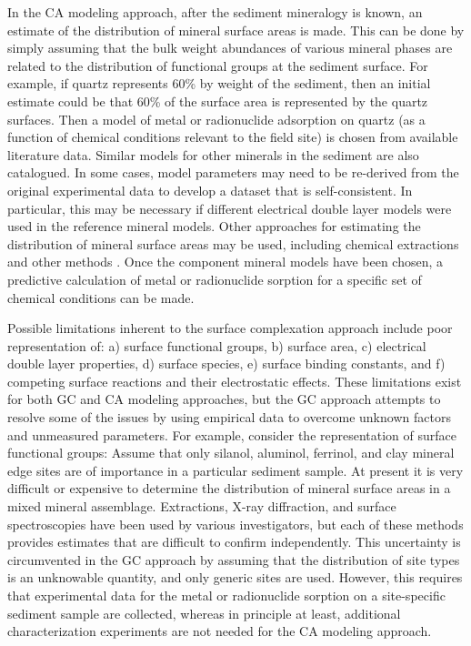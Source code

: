 In the CA modeling approach, after the sediment mineralogy is known, an estimate of the distribution of mineral surface areas is made.  This can be done by simply assuming that the bulk weight abundances of various mineral phases are related to the distribution of functional groups at the sediment surface.  For example, if quartz represents 60\% by weight of the sediment, then an initial estimate could be that 60\% of the surface area is represented by the quartz surfaces. Then a model of metal or radionuclide adsorption on quartz (as a function of chemical conditions relevant to the field site) is chosen from available literature data.  Similar models for other minerals in the sediment are also catalogued.  In some cases, model parameters may need to be re-derived from the original experimental data to develop a dataset that is self-consistent. In particular, this may be necessary if different electrical double layer models were used in the reference mineral models.  Other approaches for estimating the distribution of mineral surface areas may be used, including chemical extractions and other methods \citep{davis-2004, davis-1998}.  Once the component mineral models have been chosen, a predictive calculation of metal or radionuclide sorption for a specific set of chemical conditions can be made.

Possible limitations inherent to the surface complexation approach include poor representation of: a) surface functional groups, b) surface area, c) electrical double layer properties, d) surface species, e) surface binding constants, and f) competing surface reactions and their electrostatic effects. These limitations exist for both GC and CA modeling approaches, but the GC approach attempts to resolve some of the issues by using empirical data to overcome unknown factors and unmeasured parameters. For example, consider the representation of surface functional groups: Assume that only silanol, aluminol, ferrinol, and clay mineral edge sites are of importance in a particular sediment sample. At present it is very difficult or expensive to determine the distribution of mineral surface areas in a mixed mineral assemblage. Extractions, X-ray diffraction, and surface spectroscopies have been used by various investigators, but each of these methods provides estimates that are difficult to confirm independently. This uncertainty is circumvented in the GC approach by assuming that the distribution of site types is an unknowable quantity, and only generic sites are used. However, this requires that experimental data for the metal or radionuclide sorption on a site-specific sediment sample are collected, whereas in principle at least, additional characterization experiments are not needed for the CA modeling approach.

